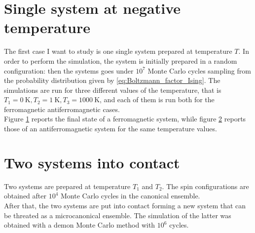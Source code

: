 \section{Single system at negative temperature}
The first case I want to study is one single system prepared at temperature $T$. In order to perform the simulation, the system is initially prepared in a random configuration: then the systems goes under $10^7$ Monte Carlo cycles 
sampling from the probability distribution given by \ref{eq:Boltzmann_factor_Ising}. The simulations are run for three different values of the temperature, that is $T_1 = \SI{0}{\kelvin}, T_2 = \SI{1}{\kelvin}, T_3 = \SI{1000}{\kelvin}$, and each of them is run both 
for the ferromagnetic antiferromagnetic cases. \\
Figure \ref{fig:MC_single_final_state_ferro} reports the final state of a ferromagnetic system, while
figure \ref{fig:MC_single_final_state_antiferro} reports those of an antiferromagnetic system for the same temperature values.
\begin{figure}
    \centering 
    \caption{}
    \label{fig:MC_single_final_state_ferro}
\end{figure}
\begin{figure}
    \centering 
    \caption{}
    \label{fig:MC_single_final_state_antiferro}
\end{figure}
\section{Two systems into contact}
Two systems are prepared at temperature $T_1$ and $T_2$. The spin configurations are obtained after $10^4$ Monte Carlo cycles in the canonical ensemble. \\
After that, the two systems are put into contact forming a new system that can be threated as a microcanonical ensemble. The simulation of the latter was obtained with a 
demon Monte Carlo method with $10^6$ cycles.

